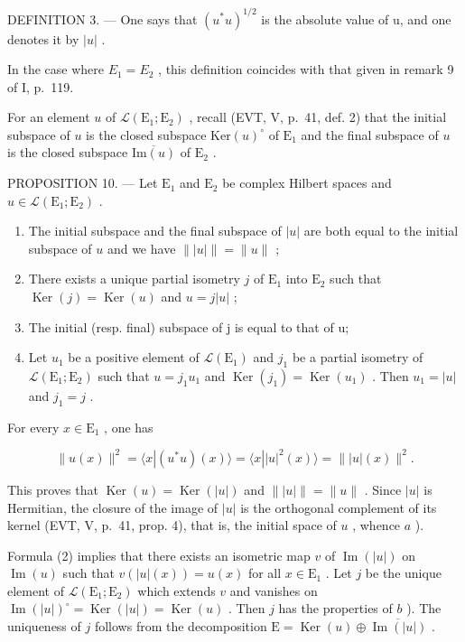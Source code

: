 DEFINITION 3. --- One says that \((u^{*}u)^{1/2}\) is the absolute value of u, and one denotes it by \(|u|\) .

In the case where \(E_{1} = E_{2}\) , this definition coincides with that given in remark 9 of I, p.~119.

For an element \(u\) of \(\mathcal{L}(\mathrm{E}_{1};\mathrm{E}_{2})\) , recall (EVT, V, p.~41, def. 2) that the initial subspace of \(u\) is the closed subspace \(\mathrm{Ker}(u)^{\circ}\) of \(\mathrm{E}_{1}\) and the final subspace of \(u\) is the closed subspace \(\overline{\mathrm{Im}(u)}\) of \(\mathrm{E}_{2}\) .

PROPOSITION 10. --- Let \(\mathrm{E}_1\) and \(\mathrm{E}_2\) be complex Hilbert spaces and \(u \in \mathcal{L}(\mathrm{E}_1; \mathrm{E}_2)\) .

\begin{enumerate}
\def\labelenumi{\alph{enumi})}
\item
  The initial subspace and the final subspace of \(|u|\) are both equal to the initial subspace of \(u\) and we have \(\| |u| \| = \| u\|\) ;
\item
  There exists a unique partial isometry \(j\) of \(\mathrm{E}_1\) into \(\mathrm{E}_2\) such that \(\operatorname{Ker}(j) = \operatorname{Ker}(u)\) and \(u = j|u|\) ;
\item
  The initial (resp. final) subspace of j is equal to that of u;
\item
  Let \(u_{1}\) be a positive element of \(\mathcal{L}(\mathrm{E}_{1})\) and \(j_{1}\) be a partial isometry of \(\mathcal{L}(\mathrm{E}_{1};\mathrm{E}_{2})\) such that \(u = j_{1}u_{1}\) and \(\operatorname{Ker}(j_{1}) = \operatorname{Ker}(u_{1})\) . Then \(u_{1} = |u|\) and \(j_{1} = j\) .
\end{enumerate}

For every \(x\in \mathrm{E}_1\) , one has

\[
\| u (x) \| ^ {2} = \langle x | (u ^ {*} u) (x) \rangle = \langle x | | u | ^ {2} (x) \rangle = \| | u | (x) \| ^ {2}.\tag{2}
\]

This proves that \(\operatorname{Ker}(u) = \operatorname{Ker}(|u|)\) and \(\| |u| \| = \|u\|\) . Since \(|u|\) is Hermitian, the closure of the image of \(|u|\) is the orthogonal complement of its kernel (EVT, V, p.~41, prop. 4), that is, the initial space of \(u\) , whence \(a\) ).

Formula (2) implies that there exists an isometric map \(v\) of \(\operatorname{Im}(|u|)\) on \(\operatorname{Im}(u)\) such that \(v(|u|(x)) = u(x)\) for all \(x \in \mathrm{E}_1\) . Let \(j\) be the unique element of \(\mathcal{L}(\mathrm{E}_1; \mathrm{E}_2)\) which extends \(v\) and vanishes on \(\operatorname{Im}(|u|)^{\circ} = \operatorname{Ker}(|u|) = \operatorname{Ker}(u)\) . Then \(j\) has the properties of \(b\) ). The uniqueness of \(j\) follows from the decomposition \(\mathrm{E} = \operatorname{Ker}(u) \oplus \overline{\operatorname{Im}(|u|)}\) .

